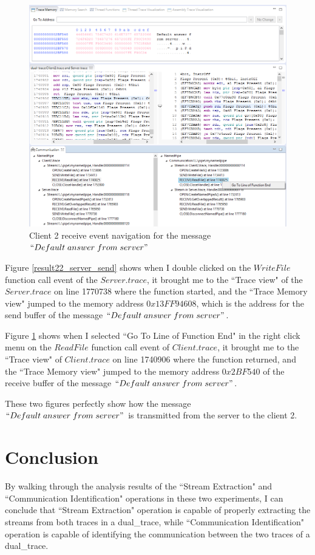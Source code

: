 \begin{figure}
\includegraphics[width=\textwidth]{Figures/result22_client_read}
 \caption{Client 2 receive event navigation for the message $``Default\; answer\; from\; server"$}
\label{result22_client_read}
\end{figure}

Figure \ref{result22_server_send} shows when I double clicked on the $WriteFile$ function call event of the $Server.trace$, it brought me to the ``Trace view" of the $Server.trace$ on line 1770738 where the function started, and the ``Trace Memory view" jumped to the memory address $0x13FF94608$, which is the address for the send buffer of the message $``Default\; answer\; from\; server"$.

Figure \ref{result22_client_read} shows when I selected ``Go To Line of Function End" in the right click menu on the $ReadFile$ function call event of $Client.trace$, it brought me to the ``Trace view" of $Client.trace$ on line 1740906 where the function returned, and the ``Trace Memory view" jumped to the memory address $0x2BF540$ of the receive buffer of the message $``Default\; answer\; from\; server"$.

These two figures perfectly show how the message $``Default\; answer\; from\; server"$ is transmitted from the server to the client 2.

\section{Conclusion}
By walking through the analysis results of the ``Stream Extraction" and ``Communication Identification" operations in these two experiments, I can conclude that ``Stream Extraction" operation is capable of properly extracting the streams from both traces in a dual\_trace, while ``Communication Identification" operation is capable of identifying the communication between the two traces of a dual\_trace. 

